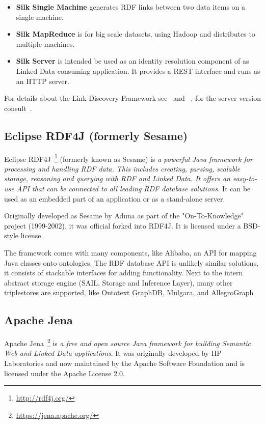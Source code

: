 \begin{itemize}
\item \textbf{Silk Single Machine} generates RDF links between two data items on a 
single machine.
\item \textbf{Silk MapReduce} is for big scale datasets, using Hadoop and 
distributes to multiple machines.
\item \textbf{Silk Server} is intended be used as an identity resolution component 
of as Linked Data consuming application. It provides a REST interface and runs as 
an HTTP server.
\end{itemize}

For details about the Link Discovery Framework see~\cite{volz2009silk} and~
\cite{jentzsch2010silk}, for the server version consult~\cite{isele2010silk}.

\subsection{Eclipse RDF4J (formerly Sesame)}
Eclipse RDF4J~\footnote{\url{http://rdf4j.org/}} (formerly known as Sesame) is 
\emph{a powerful Java framework for processing and handling RDF data. This 
includes creating, parsing, scalable storage, reasoning and querying with RDF and 
Linked Data. It offers an easy-to-use API that can be connected to all leading RDF 
database solutions.} It can be used as an embedded part of an application or as a 
stand-alone server.

Originally developed as Sesame by Aduna as part of the "On-To-Knowledge" project 
(1999-2002), it was official forked into RDF4J. It is licensed under a BSD-style 
license.

The framework comes with many components, like Alibaba, an API for mapping Java 
classes onto ontologies. The RDF database API is unlikely similar solutions, it 
consists of stackable interfaces for adding functionality. Next to the intern 
abstract storage engine (SAIL, Storage and Inference Layer), many other 
triplestores are supported, like  Ontotext GraphDB, Mulgara, and AllegroGraph

\subsection{Apache Jena}

Apache Jena~\footnote{\url{https://jena.apache.org/}} is \emph{a free and open 
source Java framework for building Semantic Web and Linked Data applications}. It 
was originally developed by HP Laboratories and now maintained by the Apache 
Software Foundation and is licensed under the Apache License 2.0.

